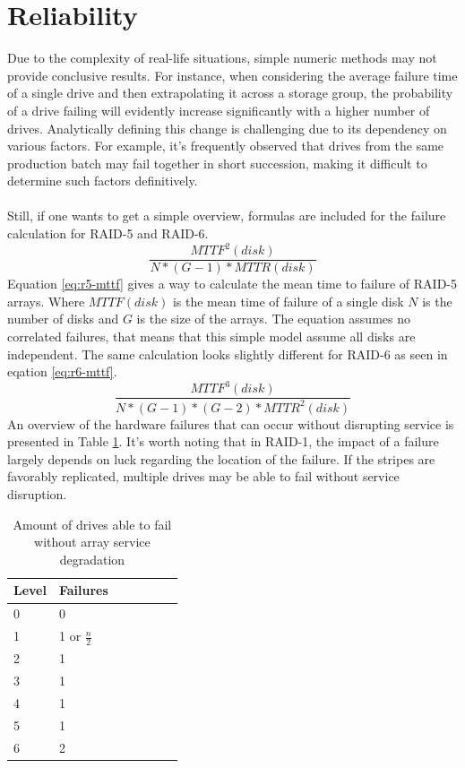 \documentclass{article}
\begin{document}
\section{Reliability}
Due to the complexity of real-life situations, simple numeric methods may not provide conclusive results. For instance, when considering the average failure time of a single drive and then extrapolating it across a storage group, the probability of a drive failing will evidently increase significantly with a higher number of drives. Analytically defining this change is challenging due to its dependency on various factors. For example, it's frequently observed that drives from the same production batch may fail together in short succession, making it difficult to determine such factors definitively. \cite{cmu:raidhighperf}
\\ \\
Still, if one wants to get a simple overview, formulas are included for the failure calculation for RAID-5
and RAID-6.
\begin{equation}
    \label{eq:r5-mttf}
    \frac{MTTF^2(disk)}{N*(G-1)*MTTR(disk)}
\end{equation}
Equation \ref{eq:r5-mttf} gives a way to calculate the mean time to failure
of RAID-5 arrays.
Where \(MTTF(disk)\) is the mean time of failure of a single disk
\(N\) is the number of disks and \(G\) is the size of the arrays.
The equation assumes no correlated failures, that means that
this simple model assume all disks are independent.
The same calculation looks slightly different for RAID-6 as seen
in eqation \ref{eq:r6-mttf}. \cite{cmu:raidhighperf}
\begin{equation}
    \label{eq:r6-mttf}
    \frac
    {MTTF^3(disk)}
    {N*(G-1)*(G-2)*MTTR^2(disk)}
\end{equation}
An overview of the hardware failures that can occur without disrupting service 
is presented in Table \ref{tab:reliability}.
It's worth noting that in RAID-1, the impact of a failure largely
depends on luck regarding the location of the failure.
If the stripes are favorably replicated, multiple drives
may be able to fail without service disruption. \cite{uw:raid} 
\begin{table}[h]
    \begin{tabularx}{\textwidth}{l|X|X|X|X|X|X}
        \textbf{Level} &
        Failures \\
        \hline
        0 & 0 \\
        1 & 1 or \( \frac{n}{2} \) \\
        2 & 1 \\
        3 & 1 \\
        4 & 1 \\
        5 & 1 \\
        6 & 2 \\
       \end{tabularx}
    \caption{Amount of drives able to fail without array service degradation \cite{uw:raid}}
    \label{tab:reliability}
\end{table}
\pagebreak
\end{document}
